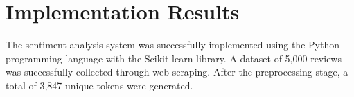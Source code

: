 \section{Implementation Results}

The sentiment analysis system was successfully implemented using the Python programming language with the Scikit-learn library. A dataset of 5,000 reviews was successfully collected through web scraping. After the preprocessing stage, a total of 3,847 unique tokens were generated.
